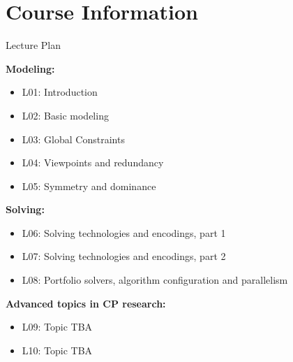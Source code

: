 \documentclass{cons-beamer}
\begin{document}
\section{Course Information}

\begin{frame}{Lecture Plan}
	\footnotesize
	
	\textbf{Modeling:}
	\begin{itemize} \setlength{\itemsep}{0pt}
		\item L01: Introduction
		\item L02: Basic modeling
		\item L03: Global Constraints
		\item L04: Viewpoints and redundancy
		\item L05: Symmetry and dominance
	\end{itemize}
	
	\textbf{Solving:}
	\begin{itemize} \setlength{\itemsep}{0pt}
		\item L06: Solving technologies and encodings, part 1
		\item L07: Solving technologies and encodings, part 2
		\item L08: Portfolio solvers, algorithm configuration and parallelism
	\end{itemize}
	
	\textbf{Advanced topics in CP research:}
	\begin{itemize} \setlength{\itemsep}{0pt}
		\item L09: Topic TBA
		\item L10: Topic TBA
	\end{itemize}
\end{frame}


\end{document}
